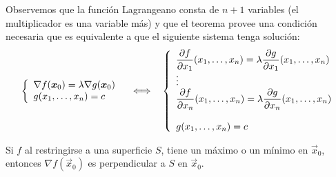 
Observemos que la funci\'on Lagrangeano consta de $n+1$ variables (el multiplicador es una variable m\'as) y que el teorema provee una condici\'on necesaria que es equivalente a que el siguiente sistema tenga soluci\'on:
\begin{equation}\label{*1}%
\begin{array}
[c]{lll}%
\left\{
\begin{array}
[c]{l}%
\nabla f(\vec{x}_{0})=\lambda\nabla g(\vec{x}_{0})\\
g(x_{1},\ldots,x_{n})=c
\end{array}
\right.
& \:\Longleftrightarrow\: & \left\{
\begin{array}
[c]{l}%
\displaystyle \frac{\partial f}{\partial x_{1}}(x_{1},\ldots,x_{n})=\lambda\frac{\partial
g}{\partial x_{1}}(x_{1},\ldots,x_{n})\\
\vdots \\
\displaystyle \frac{\partial f}{\partial x_{n}}(x_{1},\ldots,x_{n})=\lambda\frac{\partial
g}{\partial x_{n}}(x_{1},\ldots,x_{n})\\
\\g(x_{1},\ldots,x_{n})=c
\end{array}
\right.
\end{array} 
\end{equation}

\begin{corolario}
Si $f$ al restringirse a una superficie $S$, tiene un m\'aximo o un
m\'inimo en $\vec{x}_{0}$, entonces $\nabla f(\vec{x}_{0})$ es perpendicular a $S$ en
$\vec{x}_{0}$.
\end{corolario}

%	

